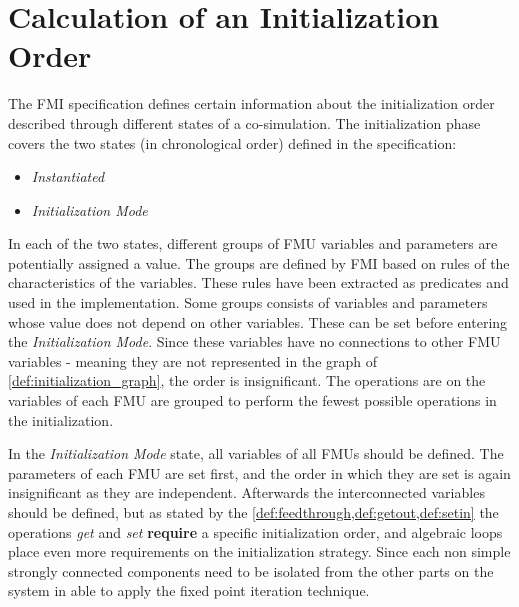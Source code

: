 \section{Calculation of an Initialization Order}\label{sc:initilization}
The FMI specification defines certain information about the initialization order described through different states of a co-simulation. The initialization phase covers the two states (in chronological order) defined in the specification:
\begin{itemize}
    \item \textit{Instantiated}
    \item \textit{Initialization Mode}
\end{itemize}
In each of the two states, different groups of FMU variables and parameters are potentially assigned a value. The groups are defined by FMI based on rules of the characteristics of the variables. These rules have been extracted as predicates and used in the implementation. 
Some groups consists of variables and parameters whose value does not depend on other variables. These can be set before entering the \textit{Initialization Mode}. Since these variables have no connections to other FMU variables - meaning they are not represented in the graph of \cref{def:initialization_graph}, the order is insignificant. 
The operations are on the variables of each FMU are grouped to perform the fewest possible operations in the initialization. 

In the \textit{Initialization Mode} state, all variables of all FMUs should be defined.
The parameters of each FMU are set first, and the order in which they are set is again insignificant as they are independent.
Afterwards the interconnected variables should be defined, but as stated by the \cref{def:feedthrough,def:getout,def:setin} the operations \textit{get} and \textit{set} \textbf{require} a specific initialization order, and algebraic loops place even more requirements on the initialization strategy. Since each non simple strongly connected components need to be isolated from the other parts on the system in able to apply the fixed point iteration technique. 


